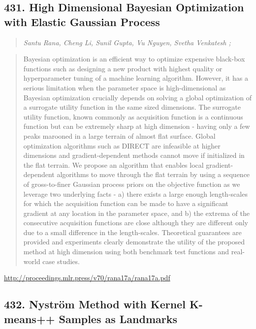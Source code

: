 \documentclass{article}
\begin{document}
\subsection{431. High Dimensional Bayesian Optimization with Elastic Gaussian Process}

\begin{quote}
\footnotesize{\textit{Santu Rana, Cheng Li, Sunil Gupta, Vu Nguyen, Svetha Venkatesh ;}}

\end{quote}

\begin{quote}
    Bayesian optimization is an efficient way to optimize expensive black-box functions such as designing a new product with highest quality or hyperparameter tuning of a machine learning algorithm. However, it has a serious limitation when the parameter space is high-dimensional as Bayesian optimization crucially depends on solving a global optimization of a surrogate utility function in the same sized dimensions. The surrogate utility function, known commonly as acquisition function is a continuous function but can be extremely sharp at high dimension - having only a few peaks marooned in a large terrain of almost flat surface. Global optimization algorithms such as DIRECT are infeasible at higher dimensions and gradient-dependent methods cannot move if initialized in the flat terrain. We propose an algorithm that enables local gradient-dependent algorithms to move through the flat terrain by using a sequence of gross-to-finer Gaussian process priors on the objective function as we leverage two underlying facts - a) there exists a large enough length-scales for which the acquisition function can be made to have a significant gradient at any location in the parameter space, and b) the extrema of the consecutive acquisition functions are close although they are different only due to a small difference in the length-scales. Theoretical guarantees are provided and experiments clearly demonstrate the utility of the proposed method at high dimension using both benchmark test functions and real-world case studies.  
\end{quote}

\href{http://proceedings.mlr.press/v70/rana17a/rana17a.pdf}{http://proceedings.mlr.press/v70/rana17a/rana17a.pdf}

\subsection{432. Nyström Method with Kernel K-means++ Samples as Landmarks}
\end{document}
